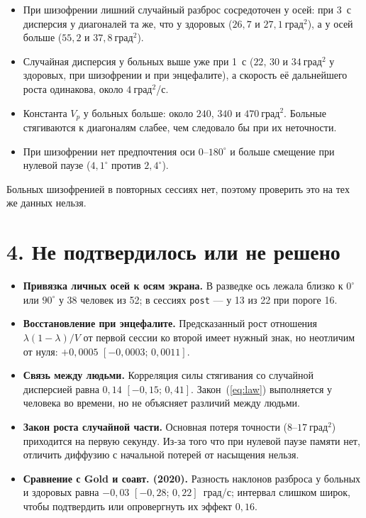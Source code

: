 \documentclass[10pt,a4paper]{article}
\newcommand{\gr}{^{\circ}}
\newcommand{\ci}[2]{$[#1;\,#2]$}
\newcommand{\dsq}{\text{град}^2}
\begin{document}
\begin{itemize}
\item При шизофрении лишний случайный разброс сосредоточен у осей: при 3~с дисперсия у диагоналей та же, что
у здоровых ($26,7$ и $27,1~\dsq$), а у осей больше ($55,2$ и $37,8~\dsq$).
\item Случайная дисперсия у больных выше уже при 1~с ($22$, $30$ и $34~\dsq$ у здоровых, при шизофрении и при
энцефалите), а скорость её дальнейшего роста одинакова, около $4~\dsq$/с.
\item Константа $V_p$ у больных больше: около $240$, $340$ и $470~\dsq$. Больные стягиваются к диагоналям слабее,
чем следовало бы при их неточности.
\item При шизофрении нет предпочтения оси $0$--$180\gr$ и больше смещение при нулевой паузе
($4,1\gr$ против $2,4\gr$).
\end{itemize}
Больных шизофренией в повторных сессиях нет, поэтому проверить это на тех же данных нельзя.

\section*{4. Не подтвердилось или не решено}

\begin{itemize}
\item \textbf{Привязка личных осей к осям экрана.} В разведке ось лежала близко к $0\gr$ или $90\gr$ у 38 человек
из 52; в сессиях \texttt{post} --- у 13 из 22 при пороге 16.
\item \textbf{Восстановление при энцефалите.} Предсказанный рост отношения $\lambda(1-\lambda)/V$ от первой сессии
ко второй имеет нужный знак, но неотличим от нуля: $+0,0005$ \ci{-0,0003}{0,0011}.
\item \textbf{Связь между людьми.} Корреляция силы стягивания со случайной дисперсией равна $0,14$
\ci{-0,15}{0,41}. Закон~(\ref{eq:law}) выполняется у человека во времени, но не объясняет различий между людьми.
\item \textbf{Закон роста случайной части.} Основная потеря точности ($8$--$17~\dsq$) приходится на первую секунду.
Из-за того что при нулевой паузе памяти нет, отличить диффузию с начальной потерей от насыщения нельзя.
\item \textbf{Сравнение с Gold и соавт. (2020).} Разность наклонов разброса у больных и здоровых равна $-0,03$
\ci{-0,28}{0,22}~град/с; интервал слишком широк, чтобы подтвердить или опровергнуть их эффект $0,16$.
\end{itemize}
\end{document}
